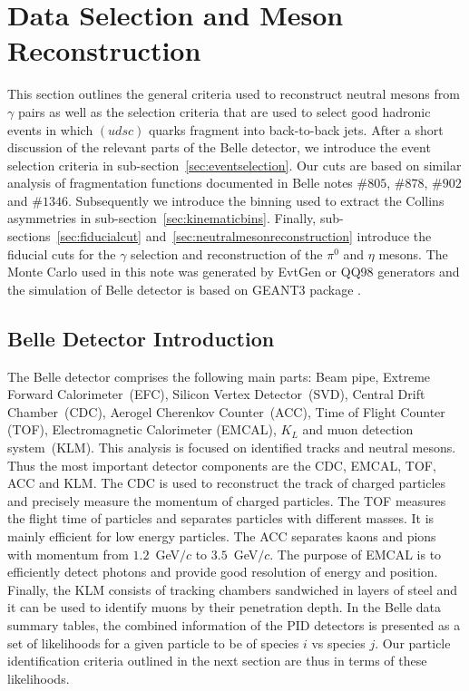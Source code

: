 \section{Data Selection and Meson Reconstruction}
\label{sec:dataselection}
This section outlines the general criteria used to reconstruct neutral mesons from $\gamma$ pairs as well as the selection criteria that are used to select good hadronic events in which $(udsc)$ quarks fragment into back-to-back jets. After a short discussion of the relevant parts of the Belle detector, we introduce the event selection criteria in sub-section~\ref{sec:eventselection}. Our cuts are based on similar analysis of fragmentation functions documented in Belle notes $\#805$, $\#878$, $\#902$ and $\#1346$. 
Subsequently we introduce the binning used to extract the Collins asymmetries in sub-section~\ref{sec:kinematicbins}.
Finally, sub-sections~\ref{sec:fiducialcut} and~\ref{sec:neutralmesonreconstruction} introduce the fiducial cuts for the $\gamma$ selection and reconstruction of the $\pi^0$ and $\eta$ mesons.
The Monte Carlo used in this note was generated by EvtGen or QQ98 generators and the simulation of Belle detector is based on GEANT3 package \cite{DetectorSimulation}. 

\subsection{Belle Detector Introduction}
The Belle detector comprises the following main parts: Beam pipe, Extreme Forward Calorimeter~(EFC), Silicon Vertex Detector~(SVD), Central Drift Chamber~(CDC), Aerogel Cherenkov Counter~(ACC), Time of Flight Counter (TOF), Electromagnetic Calorimeter (EMCAL), $K_L$ and muon detection system~(KLM).
 This analysis is focused on identified tracks and neutral mesons. Thus the most important detector components are the CDC,  EMCAL, TOF, ACC and KLM.
 The CDC is used to reconstruct the track of charged particles and precisely measure the momentum of charged particles.  The TOF measures the flight time of particles and separates particles with different masses. It is mainly efficient for low energy particles. The ACC separates kaons and pions with momentum from $1.2$~GeV$/c$ to $3.5$~GeV$/c$. The purpose of EMCAL is to efficiently detect photons and provide good resolution of energy and position. Finally, the KLM consists of tracking chambers sandwiched in layers of steel and it can be used to identify muons by their penetration depth. In the Belle data summary tables, the combined information of the PID detectors is presented as a set of likelihoods for a given particle to be of species $i$ vs species $j$. Our particle identification criteria outlined in the next section are thus in terms of these likelihoods. 

